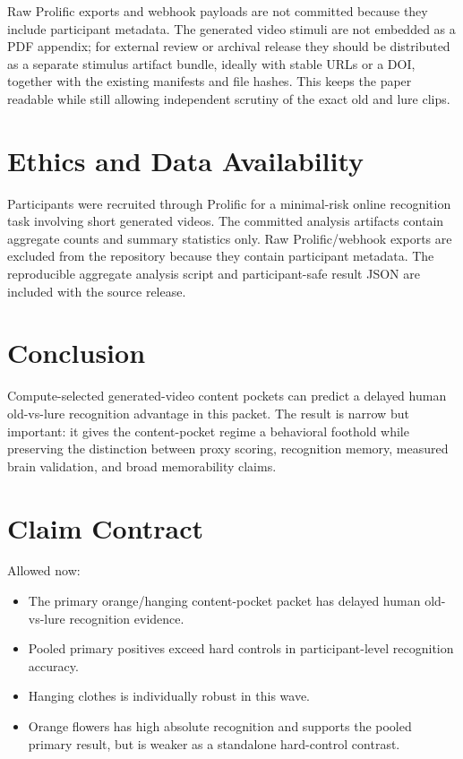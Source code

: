 \documentclass[11pt]{article}
\begin{document}
Raw Prolific exports and webhook payloads are not committed because they include
participant metadata. The generated video stimuli are not embedded as a PDF
appendix; for external review or archival release they should be distributed as
a separate stimulus artifact bundle, ideally with stable URLs or a DOI, together
with the existing manifests and file hashes. This keeps the paper readable while
still allowing independent scrutiny of the exact old and lure clips.

\section{Ethics and Data Availability}

Participants were recruited through Prolific for a minimal-risk online
recognition task involving short generated videos. The committed analysis
artifacts contain aggregate counts and summary statistics only. Raw
Prolific/webhook exports are excluded from the repository because they contain
participant metadata. The reproducible aggregate analysis script and
participant-safe result JSON are included with the source release.

\section{Conclusion}

Compute-selected generated-video content pockets can predict a delayed human
old-vs-lure recognition advantage in this packet. The result is narrow but
important: it gives the content-pocket regime a behavioral foothold while
preserving the distinction between proxy scoring, recognition memory, measured
brain validation, and broad memorability claims.

\appendix

\section{Claim Contract}

Allowed now:
\begin{itemize}
  \item The primary orange/hanging content-pocket packet has delayed
        human old-vs-lure recognition evidence.
  \item Pooled primary positives exceed hard controls in participant-level
        recognition accuracy.
  \item Hanging clothes is individually robust in this wave.
  \item Orange flowers has high absolute recognition and supports the pooled
        primary result, but is weaker as a standalone hard-control contrast.
\end{itemize}
\end{document}
